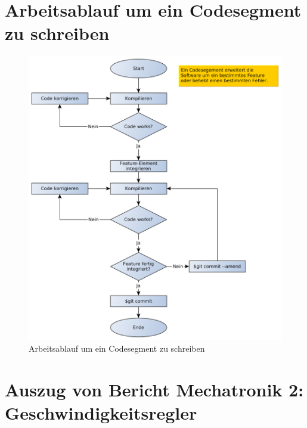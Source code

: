 \newpage
\section{Arbeitsablauf um ein Codesegment zu schreiben}
\label{anhangAblaufCodesegement}

\begin{figure}[!ht]
\centering
\includegraphics[angle=0,width=\textwidth]{images/ablaufCodesegmentSchreiben.png}
\caption{Arbeitsablauf um ein Codesegment zu schreiben}
\label{fig:arbeitsablaufSoftwareentwicklung}
\end{figure}

\newpage
\section{Auszug von Bericht Mechatronik 2: Geschwindigkeitsregler}
\label{anhang:mechatronik2}

